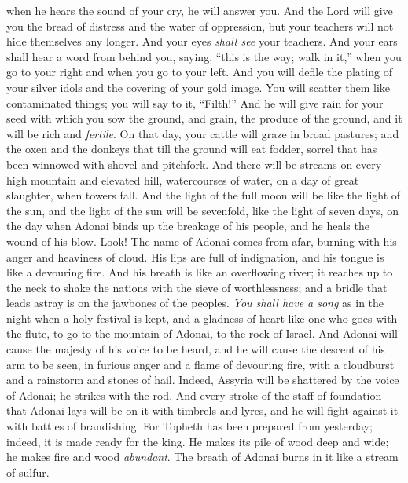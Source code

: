 \begin{biblechapter}
when he hears the sound of your cry, he will answer you.
\verse And the Lord will give you the bread of distress 
and the water of oppression, 
but your teachers will not hide themselves any longer. 
And your eyes \textit{shall see} your teachers.
\verse And your ears shall hear a word from behind you, saying, 
“this is the way; walk in it,” 
when you go to your right 
and when you go to your left.
\verse And you will defile the plating of your silver idols 
and the covering of your gold image. 
You will scatter them like contaminated things; 
you will say to it, “Filth!”
\verse And he will give rain for your seed with which you sow the ground, 
and grain, the produce of the ground, and it will be rich and \textit{fertile}. 
On that day, your cattle will graze in broad pastures;
\verse and the oxen and the donkeys that till the ground will eat fodder, sorrel 
that has been winnowed with shovel and pitchfork.
\verse And there will be streams on every high mountain and elevated hill, 
watercourses of water, on a day of great slaughter, when towers fall.
\verse And the light of the full moon will be like the light of the sun, 
and the light of the sun will be sevenfold, like the light of seven days, 
on the day when Adonai binds up the breakage of his people, 
and he heals the wound of his blow.
 Look! The name of Adonai comes from afar, 
burning with his anger and heaviness of cloud. 
His lips are full of indignation, 
and his tongue is like a devouring fire.
\verse And his breath is like an overflowing river; 
it reaches up to the neck 
to shake the nations with the sieve of worthlessness; 
and a bridle that leads astray is on the jawbones of the peoples.
\verse \textit{You shall have a song} as in the night when a holy festival is kept, 
and a gladness of heart like one who goes with the flute, 
to go to the mountain of Adonai, to the rock of Israel.
\verse And Adonai will cause the majesty of his voice to be heard, 
and he will cause the descent of his arm to be seen, 
in furious anger and a flame of devouring fire, 
with a cloudburst and a rainstorm and stones of hail.
\verse Indeed, Assyria will be shattered by the voice of Adonai; 
he strikes with the rod.
\verse And every stroke of the staff of foundation that Adonai lays will be on it with timbrels and lyres, 
and he will fight against it with battles of brandishing.
\verse For Topheth has been prepared from yesterday; 
indeed, it is made ready for the king. 
He makes its pile of wood deep and wide; 
he makes fire and wood \textit{abundant}. 
The breath of Adonai burns in it like a stream of sulfur.
\end{biblechapter}

